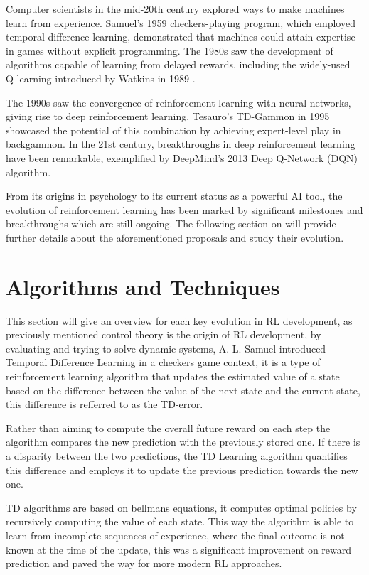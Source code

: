 Computer scientists in the mid-20th century explored ways to make machines learn from experience. Samuel's 1959 checkers-playing program, which employed temporal difference learning\cite{}, demonstrated that machines could attain expertise in games without explicit programming. The 1980s saw the development of algorithms capable of learning from delayed rewards, including the widely-used Q-learning introduced by Watkins in 1989 \cite{}.

The 1990s saw the convergence of reinforcement learning with neural networks, giving rise to deep reinforcement learning. Tesauro's TD-Gammon in 1995 showcased the potential of this combination by achieving expert-level play in backgammon\cite{}. In the 21st century, breakthroughs in deep reinforcement learning have been remarkable, exemplified by DeepMind's 2013 Deep Q-Network (DQN) algorithm\cite{}.

From its origins in psychology to its current status as a powerful AI tool, the evolution of reinforcement learning has been marked by significant milestones and breakthroughs which are still ongoing. The following section on will provide further details about the aforementioned proposals and study their evolution.

\section{Algorithms and Techniques}\label{sec:rl-algorithms_and_techniques}
This section will give an overview for each key evolution in RL development, as previously mentioned control theory is the origin of RL development, by evaluating and trying to solve dynamic systems, A. L. Samuel introduced Temporal Difference Learning \cite{samuel1959checkers} in a checkers game context, it is a type of reinforcement learning algorithm that updates the estimated value of a state based on the difference between the value of the next state and the current state, this difference is refferred to as the TD-error.

Rather than aiming to compute the overall future reward on each step the algorithm compares the new prediction with the previously stored one. If there is a disparity between the two predictions, the TD Learning algorithm quantifies this difference and employs it to update the previous prediction towards the new one.

TD algorithms are based on bellmans equations, it computes optimal policies by recursively computing the value of each state. This way the algorithm is able to learn from incomplete sequences of experience, where the final outcome is not known at the time of the update, this was a significant improvement on reward prediction and paved the way for more modern RL approaches. 

